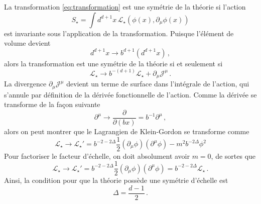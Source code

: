 \documentclass{article}
\numberwithin{equation}{section}
\theoremstyle{solution}
\begin{document}
La transformation \eqref{eq:transformation} est une symétrie de la théorie si l'action 
\begin{equation}\label{eq:action}
        S_\star = \int d^{d+1}x\, \mathcal{L}_\star(\phi(x), \partial_{\mu}\phi(x))
\end{equation} 
est invariante sous l'application de la transformation. Puisque l'élément de volume devient
\begin{equation}
        d^{d+1}x \rightarrow b^{d+1}(d^{d+1}x)\, ,
\end{equation} 
alors la transformation est une symétrie de la théorie si et seulement si
\begin{equation}
       \mathcal{L}_{\star} \rightarrow b^{-(d+1)}\mathcal{L_{\star}} + \partial_{\mu}\mathcal{J}^{\mu}\, .
\end{equation} 
La divergence $\partial_{\mu}\mathcal{J}^{\mu}$ devient un terme de surface dans l'intégrale de l'action, qui 
s'annule par définition de la dérivée fonctionnelle de l'action.
Comme la dérivée se transforme de la façon suivante
\begin{equation}
        \partial^{\mu} \rightarrow \frac{\partial}{\partial (b x)} = b^{-1}\partial^{\mu}\, ,
\end{equation}
alors on peut montrer que le Lagrangien de Klein-Gordon se transforme comme
\begin{equation}\label{eq:lagrangian transform}
        \mathcal{L}_\star \rightarrow  \mathcal{L}_\star' = b^{-2-2\Delta}\frac{1}{2}(\partial_{\mu}\phi)(\partial^\mu \phi) -m^2b^{-2\Delta}\phi^2 %
\end{equation} 
Pour factoriser le facteur d'échelle, on doit absolument avoir $\boxed{m=0}$, de sortes que
\begin{equation}\label{eq:lagrangian transform}
        \mathcal{L}_\star \rightarrow  \mathcal{L}_\star' = b^{-2-2\Delta}\frac{1}{2}(\partial_{\mu}\phi)(\partial^\mu \phi) = b^{-2-2\Delta}\mathcal{L}_\star\, .
\end{equation} 
Ainsi, la condition pour que la théorie possède une symétrie d'échelle est
\begin{equation}\label{eq:Delta}
        \boxed{\Delta = \frac{d - 1}{2}}\, .
\end{equation} 
\end{document}

